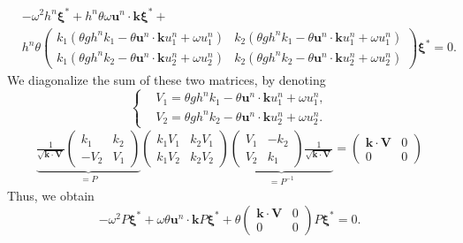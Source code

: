 \documentclass[a4paper, 11pt]{report}
\begin{document}
\begin{equation*}
\begin{split}
&-\omega^2h^n\boldsymbol{\xi}^*+h^n\theta\omega \boldsymbol{u}^n\cdot \boldsymbol{k}\boldsymbol{\xi}^*+\\
&h^n\theta\begin{pmatrix}k_1(\theta gh^nk_1-\theta \boldsymbol{u}^n\cdot \boldsymbol{k}u_1^n+\omega u_1^n)&k_2(\theta gh^nk_1-\theta \boldsymbol{u}^n\cdot \boldsymbol{k}u_1^n+\omega u_1^n)\\
k_1(\theta gh^nk_2-\theta \boldsymbol{u}^n\cdot \boldsymbol{k}u_2^n+\omega u_2^n)&k_2(\theta gh^nk_2-\theta \boldsymbol{u}^n\cdot \boldsymbol{k}u_2^n+\omega u_2^n)\end{pmatrix}\boldsymbol{\xi}^*=0.
\end{split}
\end{equation*}
We diagonalize the sum of these two matrices, by denoting \begin{equation*}
\left\{\begin{split}
&V_1=\theta gh^nk_1-\theta \boldsymbol{u}^n\cdot \boldsymbol{k}u_1^n+\omega u_1^n,\\
&V_2=\theta gh^nk_2-\theta \boldsymbol{u}^n\cdot \boldsymbol{k}u_2^n+\omega u_2^n.
\end{split}\right.
\end{equation*}
\begin{equation*}
\begin{split}
\underbrace{\frac{1}{\sqrt{\boldsymbol{k}\cdot \boldsymbol{V}}}
\begin{pmatrix}
k_1&k_2\\-V_2&V_1
\end{pmatrix}}_{=P}\begin{pmatrix}k_1V_1&k_2V_1\\k_1V_2&k_2V_2\end{pmatrix}\underbrace{\begin{pmatrix}V_1&-k_2\\V_2&k_1\end{pmatrix}\frac{1}{\sqrt{\boldsymbol{k}\cdot \boldsymbol{V}}}}_{=P^{-1}}=\begin{pmatrix}\boldsymbol{k}\cdot \boldsymbol{V}&0\\0&0\end{pmatrix}
\end{split}
\end{equation*}
Thus, we obtain
\begin{equation*}
-\omega^2P\boldsymbol{\xi}^*+\omega\theta \boldsymbol{u}^n\cdot \boldsymbol{k}P\boldsymbol{\xi}^*+\theta\begin{pmatrix}\boldsymbol{k}\cdot \boldsymbol{V}&0\\0&0\end{pmatrix}P\boldsymbol{\xi}^*=0.
\end{equation*}
\end{document}
